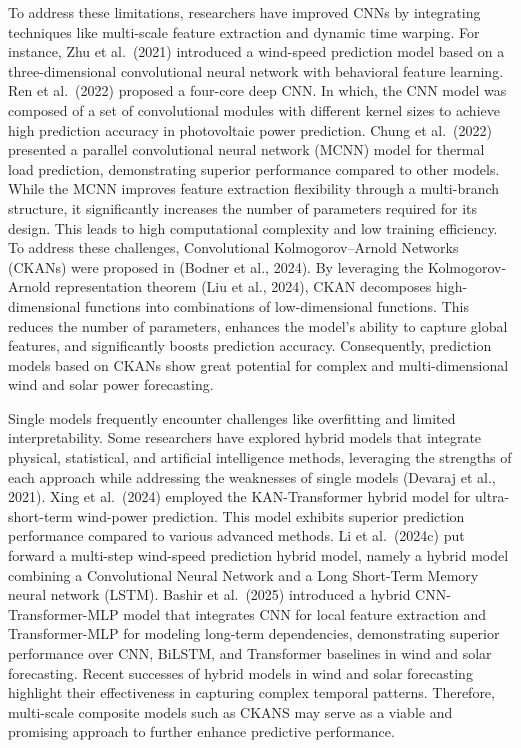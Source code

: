 \documentclass[
  10
]{article}
\begin{document}
To address these limitations, researchers have improved CNNs by
integrating techniques like multi-scale feature extraction and dynamic
time warping. For instance, Zhu et al.~(2021) introduced a wind-speed
prediction model based on a three-dimensional convolutional neural
network with behavioral feature learning. Ren et al.~(2022) proposed a
four-core deep CNN. In which, the CNN model was composed of a set of
convolutional modules with different kernel sizes to achieve high
prediction accuracy in photovoltaic power prediction. Chung et
al.~(2022) presented a parallel convolutional neural network (MCNN)
model for thermal load prediction, demonstrating superior performance
compared to other models. While the MCNN improves feature extraction
flexibility through a multi-branch structure, it significantly increases
the number of parameters required for its design. This leads to high
computational complexity and low training efficiency. To address these
challenges, Convolutional Kolmogorov--Arnold Networks (CKANs) were
proposed in (Bodner et al., 2024). By leveraging the Kolmogorov-Arnold
representation theorem (Liu et al., 2024), CKAN decomposes
high-dimensional functions into combinations of low-dimensional
functions. This reduces the number of parameters, enhances the model's
ability to capture global features, and significantly boosts prediction
accuracy. Consequently, prediction models based on CKANs show great
potential for complex and multi-dimensional wind and solar power
forecasting.

Single models frequently encounter challenges like overfitting and
limited interpretability. Some researchers have explored hybrid models
that integrate physical, statistical, and artificial intelligence
methods, leveraging the strengths of each approach while addressing the
weaknesses of single models (Devaraj et al., 2021). Xing et al.~(2024)
employed the KAN-Transformer hybrid model for ultra-short-term
wind-power prediction. This model exhibits superior prediction
performance compared to various advanced methods. Li et al.~(2024c) put
forward a multi-step wind-speed prediction hybrid model, namely a hybrid
model combining a Convolutional Neural Network and a Long Short-Term
Memory neural network (LSTM). Bashir et al.~(2025) introduced a hybrid
CNN-Transformer-MLP model that integrates CNN for local feature
extraction and Transformer-MLP for modeling long-term dependencies,
demonstrating superior performance over CNN, BiLSTM, and Transformer
baselines in wind and solar forecasting. Recent successes of hybrid
models in wind and solar forecasting highlight their effectiveness in
capturing complex temporal patterns. Therefore, multi-scale composite
models such as CKANS may serve as a viable and promising approach to
further enhance predictive performance.
\end{document}
